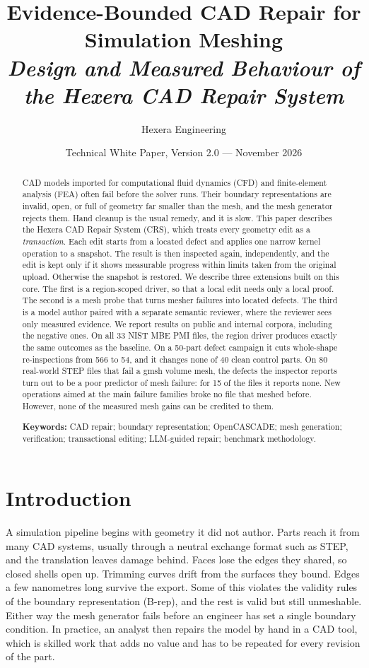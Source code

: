 \documentclass[11pt,onecolumn]{article}
\title{\vspace{-1.2cm}\bfseries Evidence-Bounded CAD Repair for Simulation Meshing\\[0.25em]
       \large\normalfont\itshape Design and Measured Behaviour of the Hexera CAD Repair System}
\author{Hexera Engineering}
\date{Technical White Paper, Version 2.0 --- November 2026}
\begin{document}
\maketitle
\thispagestyle{plain}

\begin{abstract}
\noindent
CAD models imported for computational fluid dynamics (CFD) and finite-element analysis (FEA)
often fail before the solver runs. Their boundary representations are invalid, open, or full of
geometry far smaller than the mesh, and the mesh generator rejects them. Hand cleanup is the usual
remedy, and it is slow. This paper describes the Hexera CAD Repair System (CRS), which treats every
geometry edit as a \emph{transaction}. Each edit starts from a located defect and applies one narrow
kernel operation to a snapshot. The result is then inspected again, independently, and the edit is
kept only if it shows measurable progress within limits taken from the original upload. Otherwise
the snapshot is restored. We describe three extensions built on this core. The first is a
region-scoped driver, so that a local edit needs only a local proof. The second is a mesh probe that
turns mesher failures into located defects. The third is a model author paired with a separate
semantic reviewer, where the reviewer sees only measured evidence. We report results on public and
internal corpora, including the negative ones. On all 33 NIST MBE PMI files, the region driver
produces exactly the same outcomes as the baseline. On a 50-part defect campaign it cuts whole-shape
re-inspections from 566 to 54, and it changes none of 40 clean control parts. On 80 real-world STEP
files that fail a gmsh volume mesh, the defects the inspector reports turn out to be a poor
predictor of mesh failure: for 15 of the files it reports none. New operations aimed at the main
failure families broke no file that meshed before. However, none of the measured mesh gains can be
credited to them.

\medskip
\noindent\textbf{Keywords:} CAD repair; boundary representation; OpenCASCADE; mesh generation;
verification; transactional editing; LLM-guided repair; benchmark methodology.
\end{abstract}

\section{Introduction}

A simulation pipeline begins with geometry it did not author. Parts reach it from many CAD systems,
usually through a neutral exchange format such as STEP, and the translation leaves damage behind.
Faces lose the edges they shared, so closed shells open up. Trimming curves drift from the
surfaces they bound. Edges a few nanometres long survive the export. Some of this violates the validity rules
of the boundary representation (B-rep), and the rest is valid but still unmeshable. Either way the
mesh generator fails before an engineer has set a single boundary condition. In practice, an analyst
then repairs the model by hand in a CAD tool, which is skilled work that adds no value and has to be
repeated for every revision of the part.
\end{document}

